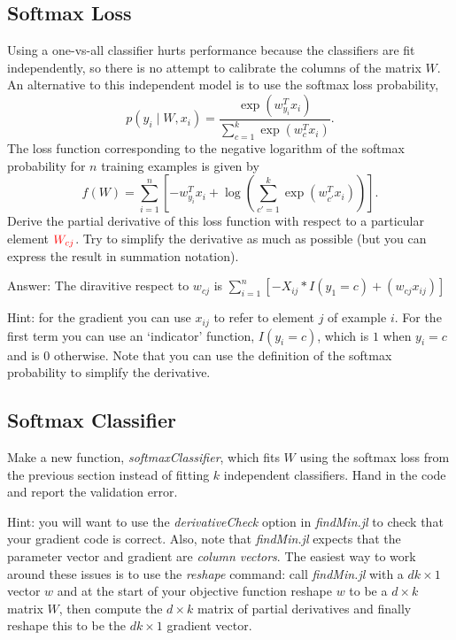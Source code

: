 \documentclass{article}
\def\ans#1{\par\gre{Answer: #1}}
\def\blu#1{{\color{blu}#1}}
\def\gre#1{{\color{gre}#1}}
\def\red#1{{\color{red}#1}}
\def\cond{\; | \;}
\begin{document}
\subsection{Softmax Loss}

Using a one-vs-all classifier hurts performance because the classifiers are fit independently, so there is no attempt to calibrate the columns of the matrix $W$. An alternative to this independent model is to use the softmax loss probability,
\[
p(y_i \cond W, x_i) = \frac{\exp(w_{y_i}^Tx_i)}{\sum_{c=1}^k\exp(w_c^Tx_i)}.
\]
The loss function corresponding to the negative logarithm of the softmax probability for $n$ training examples is given by
\[
f(W) = \sum_{i=1}^n \left[-w_{y_i}^Tx_i + \log\left(\sum_{c' = 1}^k \exp(w_{c'}^Tx_i)\right)\right].
\]
\blu{Derive the partial derivative of this loss function with respect to a particular element $\red{W_{cj}}$}. Try to simplify the derivative as much as possible (but you can express the result in summation notation).
\ans{The diravitive respect to $w_{cj}$ is $\sum _{i=1}^n [-X_{ij}*I(y_1=c) + (w_{cj}x_{ij})]$}

Hint: for the gradient you can use $x_{ij}$ to refer to element $j$ of example $i$. For the first term you can use an `indicator' function, $I(y_i = c)$, which is $1$ when $y_i = c$ and is $0$ otherwise. Note that you can use the definition of the softmax probability to simplify the derivative.



\subsection{Softmax Classifier}

Make a new function, \emph{softmaxClassifier}, which fits $W$ using the softmax loss from the previous section  instead of fitting $k$ independent classifiers. \blu{Hand in the code and report the validation error}.

Hint: you will want to use the \emph{derivativeCheck} option in \emph{findMin.jl} to check that your gradient code is correct. Also, note that \emph{findMin.jl} expects that the parameter vector and gradient are \emph{column vectors}. The easiest way to work around these issues is to use the \emph{reshape} command: call \emph{findMin.jl} with a $dk \times 1$ vector $w$ and at the start of your objective function reshape $w$ to be a $d \times k$ matrix $W$, then compute the $d \times k$ matrix of partial derivatives and finally reshape this to be the $dk \times 1$ gradient vector.
\end{document}
